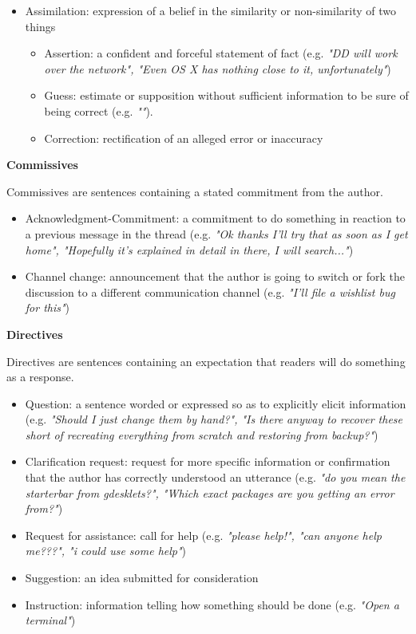 \documentclass[11pt]{article}
\begin{document}
\begin{itemize}
\begin{itemize}
		\end{itemize}
	\item Assimilation: expression of a belief in the similarity or non-similarity of two things
		\begin{itemize}
			\item Assertion: a confident and forceful statement of fact (e.g. \textit{"DD will work over the network", "Even OS X has nothing close to it, unfortunately"})
			\item Guess: estimate or supposition without sufficient information to be sure of being correct (e.g. \textit{""}).
			\item Correction: rectification of an alleged error or inaccuracy
		\end{itemize}
\end{itemize}

\textbf{Commissives}
\vspace{0.1cm}

Commissives are sentences containing a stated commitment from the author.

\begin{itemize}
	\item Acknowledgment-Commitment: a commitment to do something in reaction to a previous message in the thread (e.g. \textit{"Ok thanks I'll try that as soon as I get home", "Hopefully it's explained in detail in there, I will search..."})
	\item Channel change: announcement that the author is going to switch or fork the discussion to a different communication channel (e.g. \textit{"I'll file a wishlist bug for this"})
\end{itemize}

\textbf{Directives}
\vspace{0.1cm}

Directives are sentences containing an expectation that readers will do something as a response.

\begin{itemize}
	\item Question: a sentence worded or expressed so as to explicitly elicit information (e.g. \textit{"Should I just change them by hand?", "Is there anyway to recover these short of recreating everything from scratch and restoring from backup?"})
		\item Clarification request: request for more specific information or confirmation that the author has correctly understood an utterance (e.g. \textit{"do you mean the starterbar from gdesklets?", "Which exact packages are you getting an error from?"})
	\item Request for assistance: call for help (e.g. \textit{"please help!", "can anyone help me???", "i could use some help"})
	\item Suggestion: an idea submitted for consideration
	\item Instruction: information telling how something should be done (e.g. \textit{"Open a terminal"})
\end{itemize}
\end{document}

